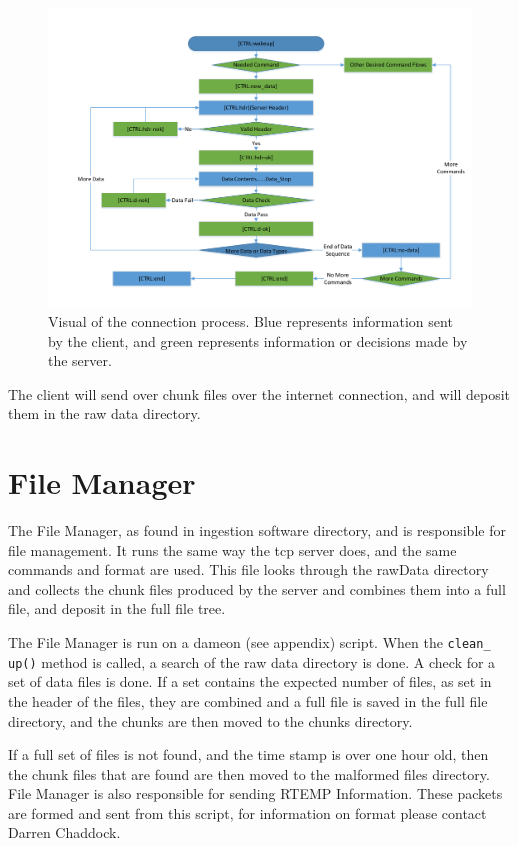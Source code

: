 \documentclass{article}
\begin{document}
\begin{figure}
\hspace*{-3cm}\includegraphics[width=1.5\textwidth]{./ServerDataFlowChart.pdf}
\caption{Visual of the connection process. Blue represents information sent by the client, and green represents information or decisions made by the server.}
\label{fig:serverFlow}
\end{figure}


The client will send over chunk files over the internet connection, and will deposit them in the raw data directory. 
\section{File Manager}

The File Manager, as found in ingestion software directory, and is responsible for file management. It runs the same way the tcp server does, and the same commands and format are used. This file looks through the rawData directory and collects the chunk files produced by the server and combines them into a full file, and deposit in the full file tree.

The File Manager is run on a dameon (see appendix) script. When the \texttt{clean\_ up()} method is called, a search of the raw data directory is done. A check for a set of data files is done. If a set contains the expected number of files, as set in the header of the files, they are combined and a full file is saved in the full file directory, and the chunks are then moved to the chunks directory. 

If a full set of files is not found, and the time stamp is over one hour old, then the chunk files that are found are then moved to the malformed files directory. File Manager is also responsible for sending RTEMP Information. These packets are formed and sent from this script, for information on format please contact Darren Chaddock.
\end{document}
